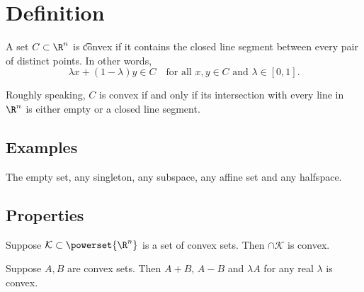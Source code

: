 
\section*{Definition}

A set $C \subset \R ^n$ is \t{convex} if it contains the closed line segment between every pair of distinct points.
In other words,
\[
\lambda x + (1-\lambda )y \in C \quad \text{for all } x, y \in C \text{ and } \lambda  \in [0,1].
\]

Roughly speaking, $C$ is convex if and only if its intersection with every line in $\R ^n$ is either empty or a closed line segment.

\subsection*{Examples}

The empty set, any singleton, any subspace, any affine set and any halfspace.

\subsection*{Properties}

\begin{proposition}
Suppose $\mathcal{K}  \subset \powerset{\R ^n}$ is a set of convex sets.
Then $\cap  \mathcal{K} $ is convex.
\end{proposition}

\begin{proposition}
Suppose $A, B$ are convex sets.
Then $A + B$, $A - B$ and $\lambda A$ for any real $\lambda $ is convex.
\end{proposition}

\blankpage